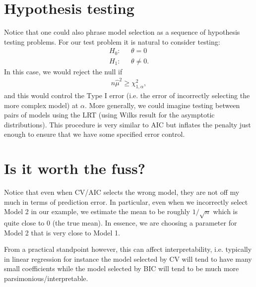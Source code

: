 \documentclass[twoside,12pt]{article}
\begin{document}
\section{Hypothesis testing}
Notice that one could also phrase model selection as a sequence of hypothesis testing problems. For our test problem it is natural to consider testing:
\begin{align*}
H_0:&~~~ \theta = 0 \\
H_1:&~~~ \theta \neq 0.
\end{align*}
In this case, we would reject the null if
\begin{align*}
n \widehat{\mu}^2 \geq \chi_{1,\alpha}^2,
\end{align*}
and this would control the Type I error (i.e. the error of incorrectly selecting the more complex model) at $\alpha$. More generally, we could imagine testing between pairs of models using the LRT (using Wilks result for the asymptotic distributions). This procedure is very similar to AIC but inflates the penalty just enough to ensure that we have some specified error control. 

\section{Is it worth the fuss?}
Notice that even when CV/AIC selects the wrong model, they are not off my much in terms of prediction error. In particular, even when we incorrectly select Model 2 in our example, we estimate the mean to be roughly $1/\sqrt{n}$ which is quite close to 0 (the true mean). In essence, we are choosing a parameter for Model 2 that is very close to Model 1.

From a practical standpoint however, this can affect interpretability, i.e. typically in linear regression for instance the model selected by CV will tend to have many small coefficients while the model selected by BIC will tend to be much more parsimonious/interpretable.
\end{document}
